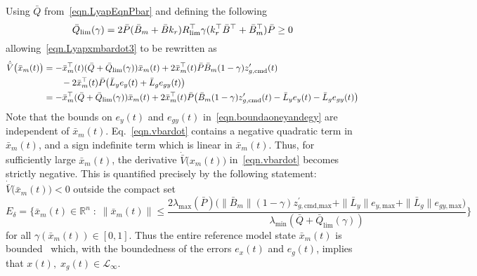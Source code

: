 \begin{proof-dan}
\begin{equation}
  \end{equation}
  Using $\bar{Q}$ from\ \eqref{eqn.LyapEqnPbar} and defining the following
  \begin{equation}
    \label{eqn.qbarlim}
    \bar{Q}_{\rm{\lim}}(\gamma)
    =
    2\bar{P}(\bar{B}_{m}+\bar{B}k_{r})R_{\text{lim}}^{\top}\gamma (k_{r}^{\top}\bar{B}^{\top}+\bar{B}_{m}^{\top})\bar{P}
    \geq
    0
  \end{equation}
  allowing\ \eqref{eqn.Lyapxmbardot3} to be rewritten as
  \begin{equation}
    \label{eqn.vbardot}
    \begin{split}
      \dot{\bar{V}}\bigr(\bar{x}_{m}(t)\bigr)
      &=
      -\bar{x}_{m}^{\top}(t)(\bar{Q}+\bar{Q}_{\rm{\lim}}(\gamma))\bar{x}_{m}(t) + 2\bar{x}_{m}^{\top}(t)\bar{P}\bar{B}_{m}(1-\gamma)z_{g,\text{cmd}}^{\prime}(t) \\
      &\qquad
      - 2\bar{x}_{m}^{\top}(t)\bar{P}\bigr(\bar{L}_{y}e_{y}(t)+\bar{L}_{g}e_{gy}(t)\bigr) \\
      &=
      -\bar{x}_{m}^{\top}(\bar{Q}+\bar{Q}_{\rm{\lim}}(\gamma))\bar{x}_{m}(t) + 2\bar{x}_{m}^{\top}(t)\bar{P}\bigr(\bar{B}_{m}(1-\gamma)z_{g,\text{cmd}}^{\prime}(t) - \bar{L}_{y}e_{y}(t) - \bar{L}_{g}e_{gy}(t)\bigr)
    \end{split}
  \end{equation}
  Note that the bounds on $e_{y}(t)$ and $e_{gy}(t)$ in\ \eqref{eqn.boundaoneyandegy} are independent of $\bar{x}_{m}(t)$.
  Eq.\ \eqref{eqn.vbardot} contains a negative quadratic term in $\bar{x}_{m}(t)$, and a sign indefinite term which is linear in $\bar{x}_{m}(t)$.
  Thus, for sufficiently large $\bar{x}_{m}(t)$, the derivative $\dot{\bar{V}}\bigr(x_{m}(t)\bigr)$ in\ \eqref{eqn.vbardot} becomes strictly negative.
  This is quantified precisely by the following statement: $\dot{\bar{V}}\bigr(\bar{x}_{m}(t)\bigr)<0$ outside the compact set
  \begin{equation}
    \label{eqn.limiterCompactSet}
    E_{\delta}=
    \biggr\{
    \bar{x}_{m}(t)\in\mathbb{R}^{n} \; : \;
    \|\bar{x}_{m}(t)\|
    \leq
    \frac{2\lambda_{\text{max}}(\bar{P})\bigr(
    \|\bar{B}_{m}\|(1-\gamma)z_{g,\text{cmd,max}}^{\prime}+
    \|\bar{L}_{y}\|e_{y,\text{max}}+\|\bar{L}_{g}\|e_{gy,\text{max}}
    \bigr)}{\lambda_{\text{min}}(\bar{Q}+\bar{Q}_{\text{lim}}(\gamma))}
    \biggr\}
  \end{equation}
  for all $\gamma(\bar{x}_{m}(t))\in[0,1]$.
  Thus the entire reference model state $\bar{x}_{m}(t)$ is bounded\ \cite{narendra.stable.2005} which, with the boundedness of the errors $e_{x}(t)$ and $e_{g}(t)$, implies that $x(t),\;x_{g}(t)\in\mathcal{L}_{\infty}$.

\end{proof-dan}
